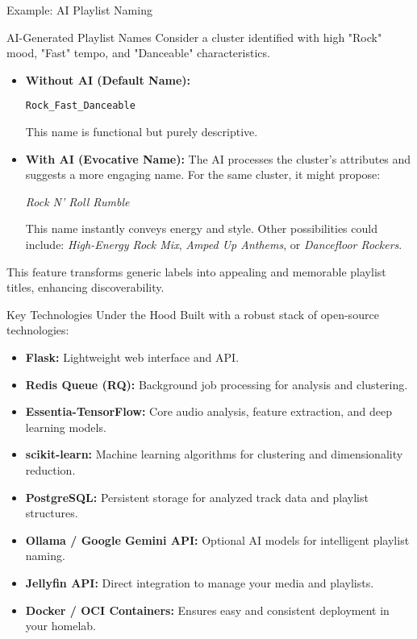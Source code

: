 \documentclass{beamer}
\begin{document}
\begin{frame}{Example: AI Playlist Naming}
    \begin{exampleblock}{AI-Generated Playlist Names}
    \small
    Consider a cluster identified with high "Rock" mood, "Fast" tempo, and "Danceable" characteristics.
    \begin{itemize}
        \item \textbf{Without AI (Default Name):}
        \begin{center} \texttt{Rock\_Fast\_Danceable} \end{center}
        This name is functional but purely descriptive.
        \item \textbf{With AI (Evocative Name):} The AI processes the cluster's attributes and suggests a more engaging name. For the same cluster, it might propose:
        \begin{center} \textit{Rock N' Roll Rumble} \end{center}
        This name instantly conveys energy and style. Other possibilities could include: \textit{High-Energy Rock Mix}, \textit{Amped Up Anthems}, or \textit{Dancefloor Rockers}.
    \end{itemize}
    This feature transforms generic labels into appealing and memorable playlist titles, enhancing discoverability.
    \end{exampleblock}
\end{frame}

\begin{frame}{Key Technologies Under the Hood}
    Built with a robust stack of open-source technologies:
    \begin{itemize}
        \item \textbf{Flask:} Lightweight web interface and API.
        \item \textbf{Redis Queue (RQ):} Background job processing for analysis and clustering.
        \item \textbf{Essentia-TensorFlow:} Core audio analysis, feature extraction, and deep learning models.
        \item \textbf{scikit-learn:} Machine learning algorithms for clustering and dimensionality reduction.
        \item \textbf{PostgreSQL:} Persistent storage for analyzed track data and playlist structures.
        \item \textbf{Ollama / Google Gemini API:} Optional AI models for intelligent playlist naming.
        \item \textbf{Jellyfin API:} Direct integration to manage your media and playlists.
        \item \textbf{Docker / OCI Containers:} Ensures easy and consistent deployment in your homelab.
    \end{itemize}
\end{frame}
\end{document}
